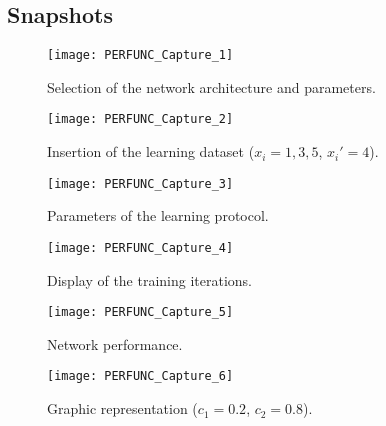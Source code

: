 \subsection{Snapshots}
\begin{figure}[h!t]
\centering
\texttt{[image: PERFUNC\_Capture\_1]}
\caption{Selection of the network architecture and parameters.}\label{PERFUNC_Capture_1}
\end{figure}
\begin{figure}[h!t]
\centering
\texttt{[image: PERFUNC\_Capture\_2]}
\caption{Insertion of the learning dataset ($x_i=1,3,5$, $x_i'=4$).}\label{PERFUNC_Capture_2}
\end{figure}
\begin{figure}[h!t]
\centering
\texttt{[image: PERFUNC\_Capture\_3]}
\caption{Parameters of the learning protocol.}\label{PERFUNC_Capture_3}
\end{figure}
\begin{figure}[h!t]
\centering
\texttt{[image: PERFUNC\_Capture\_4]}
\caption{Display of the training iterations.}\label{PERFUNC_Capture_4}
\end{figure}
\begin{figure}[h!t]
\centering
\texttt{[image: PERFUNC\_Capture\_5]}
\caption{Network performance.}\label{PERFUNC_Capture_5}
\end{figure}
\begin{figure}[h!t]
\centering
\texttt{[image: PERFUNC\_Capture\_6]}
\caption{Graphic representation ($c_1=0.2$, $c_2=0.8$).}\label{PERFUNC_Capture_6}
\end{figure}